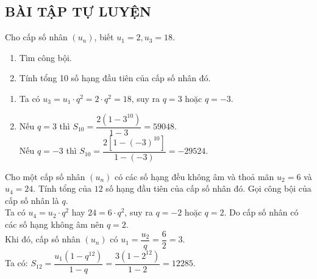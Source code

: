 \subsection{BÀI TẬP TỰ LUYỆN}


\begin{bt}%
	Cho cấp số nhân $(u_n)$, biết $u_1=2,u_3=18$.
	\begin{enumerate}
		\item Tìm công bội.
		\item Tính tổng 10 số hạng đầu tiên của cấp số nhân đó.
	\end{enumerate}
	\loigiai
	{
		\begin{enumerate}
			\item Ta có $u_3=u_1\cdot q^2=2\cdot q^2=18$, suy ra $q=3$ hoặc $q=-3$.
			\item Nếu $q=3$ thì $S_{10}=\dfrac{2\left(1-3^{10}\right)}{1-3}=59048$.\\
			Nếu $q=-3$ thì $S_{10}=\dfrac{2\left[1-(-3)^{10}\right]}{1-(-3)}=-29524$.
		\end{enumerate}
	}
\end{bt}
\begin{bt}%
	Cho một cấp số nhân $(u_n)$ có các số hạng đều không âm và thoả mãn $u_2=6$ và $u_4=24$. Tính tổng của $12$ số hạng đầu tiên của cấp số nhân đó.
	\loigiai
	{
		Gọi công bội của cấp số nhân là $q$.\\
		Ta có $u_4=u_2\cdot q^2$ hay $24=6\cdot q^2$, suy ra $q=-2$ hoặc $q=2$. Do cấp số nhân có các số hạng không âm nên $q=2$.\\
		Khi đó, cấp số nhân $(u_n)$ có $u_1=\dfrac{u_2}{q}=\dfrac{6}{2}=3$.\\
		Ta có: $S_{12}=\dfrac{u_1\left(1-q^{12}\right)}{1-q}=\dfrac{3\left(1-2^{12}\right)}{1-2}=12285$.
	}
\end{bt}
